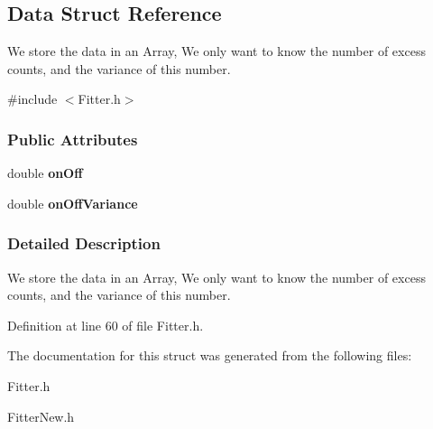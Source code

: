 \hypertarget{structData}{
\subsection{Data Struct Reference}
\label{structData}
}


We store the data in an Array, We only want to know the number of excess counts, and the variance of this number.  




{\ttfamily \#include $<$Fitter.h$>$}

\subsubsection*{Public Attributes}
\begin{DoxyCompactItemize}
\item 
\hypertarget{structData_a4785d0e7da0dfb26ec3284d6b6a1d680}{
double {\bfseries onOff}}
\label{structData_a4785d0e7da0dfb26ec3284d6b6a1d680}

\item 
\hypertarget{structData_af46d83f495c7ae27a04787e2ae0c33f8}{
double {\bfseries onOffVariance}}
\label{structData_af46d83f495c7ae27a04787e2ae0c33f8}

\end{DoxyCompactItemize}


\subsubsection{Detailed Description}
We store the data in an Array, We only want to know the number of excess counts, and the variance of this number. 

Definition at line 60 of file Fitter.h.



The documentation for this struct was generated from the following files:\begin{DoxyCompactItemize}
\item 
Fitter.h\item 
FitterNew.h\end{DoxyCompactItemize}
